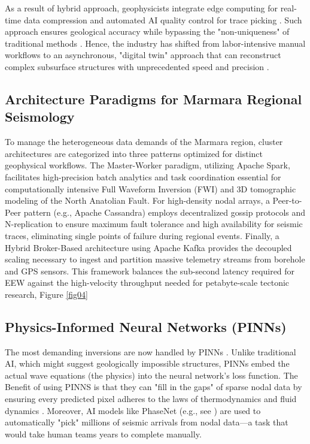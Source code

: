 \documentclass[data,article,submit,pdftex,moreauthors]{Definitions/mdpi}
\begin{document}
As a result of hybrid approach, geophysicists integrate edge computing for real-time data compression and automated AI quality control for trace picking \cite{Sitetal2021}. Such approach ensures geological accuracy while bypassing the "non-uniqueness" of traditional methods \cite{MousaviBeroza2022}. Hence, the industry has shifted from labor-intensive manual workflows to an asynchronous, "digital twin" approach that can reconstruct complex subsurface structures with unprecedented speed and precision \cite{Zhongetal2023}.

\subsection{Architecture Paradigms for Marmara Regional Seismology}

To manage the heterogeneous data demands of the Marmara region, cluster architectures are categorized into three patterns optimized for distinct geophysical workflows. The Master-Worker paradigm, utilizing Apache Spark, facilitates high-precision batch analytics and task coordination essential for computationally intensive Full Waveform Inversion (FWI) and 3D tomographic modeling of the North Anatolian Fault. For high-density nodal arrays, a Peer-to-Peer pattern (e.g., Apache Cassandra) employs decentralized gossip protocols and N-replication to ensure maximum fault tolerance and high availability for seismic traces, eliminating single points of failure during regional events. Finally, a Hybrid Broker-Based architecture using Apache Kafka provides the decoupled scaling necessary to ingest and partition massive telemetry streams from borehole and GPS sensors. This framework balances the sub-second latency required for EEW against the high-velocity throughput needed for petabyte-scale tectonic research, Figure \ref{fig04}

\subsection{Physics-Informed Neural Networks (PINNs)}

The most demanding inversions are now handled by PINNs \cite{Aghamiry2021}. Unlike traditional AI, which might suggest geologically impossible structures, PINNs embed the actual wave equations (the physics) into the neural network's loss function. The Benefit of using PINNS is that they can "fill in the gaps" of sparse nodal data by ensuring every predicted pixel adheres to the laws of thermodynamics and fluid dynamics \cite{RashtBehesht2022,Moseley2020}. Moreover, AI models like PhaseNet (e.g., see \cite{ZhuBeroza2019,Park2020,Ni2023}) are used to automatically "pick" millions of seismic arrivals from nodal data—a task that would take human teams years to complete manually.
\end{document}
